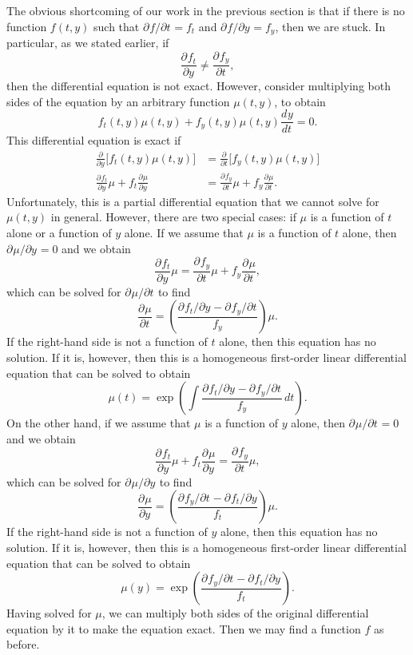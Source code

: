 \documentclass{myart}
\newcommand{\deriv}[3][]{\frac{d^{#1}#2}{d#3^{#1}}}
\newcommand{\pderiv}[3][]{\frac{\partial^{#1}#2}{\partial#3^{#1}}}
\newcommand{\fpderiv}[3][]{\partial^{#1}#2/\partial#3^{#1}}
\begin{document}
The obvious shortcoming of our work in the previous section is that if there is no function $f(t, y)$ such that $\fpderiv{f}{t} = f_t$ and $\fpderiv{f}{y} = f_y$, then we are stuck. In particular, as we stated earlier, if
\begin{equation*}
\pderiv{f_t}{y} \neq \pderiv{f_y}{t},
\end{equation*}
then the differential equation is not exact. However, consider multiplying both sides of the equation by an arbitrary function $\mu(t, y)$, to obtain
\begin{equation*}
f_t(t, y) \mu(t, y) + f_y(t, y) \mu(t, y) \deriv{y}{t} = 0.
\end{equation*}
This differential equation is exact if
\begin{align*}
\pderiv{}{y} \Big[f_t(t, y) \mu(t, y)\Big] &= \pderiv{}{t} \Big[f_y(t, y) \mu(t, y)\Big] \\
\pderiv{f_t}{y} \mu + f_t \pderiv{\mu}{y} &= \pderiv{f_y}{t} \mu + f_y \pderiv{\mu}{t}.
\end{align*}
Unfortunately, this is a partial differential equation that we cannot solve for $\mu(t, y)$ in general. However, there are two special cases: if $\mu$ is a function of $t$ alone or a function of $y$ alone. If we assume that $\mu$ is a function of $t$ alone, then $\fpderiv{\mu}{y} = 0$ and we obtain
\begin{equation*}
\pderiv{f_t}{y} \mu = \pderiv{f_y}{t} \mu + f_y \pderiv{\mu}{t},
\end{equation*}
which can be solved for $\fpderiv{\mu}{t}$ to find
\begin{equation*}
\pderiv{\mu}{t} = \left(\frac{\fpderiv{f_t}{y} - \fpderiv{f_y}{t}}{f_y}\right) \mu.
\end{equation*}
If the right-hand side is not a function of $t$ alone, then this equation has no solution. If it is, however, then this is a homogeneous first-order linear differential equation that can be solved to obtain
\begin{equation*}
\mu(t) = \exp\left(\int \frac{\fpderiv{f_t}{y} - \fpderiv{f_y}{t}}{f_y} \,dt\right).
\end{equation*}
On the other hand, if we assume that $\mu$ is a function of $y$ alone, then $\fpderiv{\mu}{t} = 0$ and we obtain
\begin{equation*}
\pderiv{f_t}{y} \mu + f_t \pderiv{\mu}{y} = \pderiv{f_y}{t} \mu,
\end{equation*}
which can be solved for $\fpderiv{\mu}{y}$ to find
\begin{equation*}
\pderiv{\mu}{y} = \left(\frac{\fpderiv{f_y}{t} - \fpderiv{f_t}{y}}{f_t}\right) \mu.
\end{equation*}
If the right-hand side is not a function of $y$ alone, then this equation has no solution. If it is, however, then this is a homogeneous first-order linear differential equation that can be solved to obtain
\begin{equation*}
\mu(y) = \exp\left(\frac{\fpderiv{f_y}{t} - \fpderiv{f_t}{y}}{f_t}\right).
\end{equation*}
Having solved for $\mu$, we can multiply both sides of the original differential equation by it to make the equation exact. Then we may find a function $f$ as before.
\end{document}
